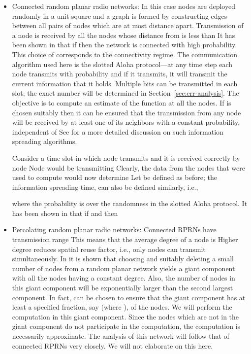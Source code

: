 \documentclass[10pt,twosided,a4paper,draft,onecolumn]{article}
\begin{document}
\begin{itemize}
\item Connected random planar radio networks: In this case nodes are
  deployed randomly in a unit square and a graph is formed by
  constructing edges between all pairs of nodes which are at most
   distance apart. Transmission of a node  is received by all
  the nodes  whose distance from  is less than  It has
  been shown in \cite{Gupta00,Penrose03} that if  then the network is connected with
  high probability. This choice of  corresponds to the
  connectivity regime. The communication algorithm used here is the
  slotted Aloha protocol---at any time step  each node transmits
  with probability  and if it transmits, it will transmit the
  current information that it holds. Multiple bits can be transmitted
  in each slot; the exact number will be determined in Section~\ref{sec:err-analysis}.
  The objective is to compute an estimate of the function at all the
  nodes. If  is chosen suitably then it can be ensured that the
  transmission from any node will be received by at least one of its
  neighbors with a constant probability, independent of  See
  \cite{Kamath08} for a more detailed discussion on such information
  spreading algorithms.

  Consider a time slot  in which node  transmits and it is
  received correctly by node  Node  would be transmitting
   Clearly, the data from the nodes that were used to compute
   would now determine  Let  be defined as
  before; the information spreading time,  can also be defined
  similarly, i.e., 

where the probability is over the randomness in the slotted Aloha
  protocol. It has been shown in \cite{Kamath08} that if  and 
  then


\item Percolating random planar radio networks: Connected RPRNs have
  transmission range 
  This means that the average degree of a node is 
  Higher degree reduces spatial reuse factor, i.e., only
   nodes can transmit
  simultaneously. In \cite{Iyer11} it is shown that choosing  and suitably deleting a small number of nodes
  from a random planar network yields a giant component with all the
  nodes having a constant degree. Also, the number of nodes in this
  giant component will be exponentially larger than the second largest
  component. In fact,  can be chosen to ensure that the giant
  component has at least a specified fraction, say  (where
  ), of the nodes. We will perform the computation in
  this giant component. Since the nodes which are not in the giant
  component do not participate in the computation, the computation is
  necessarily approximate. The analysis of this network will follow
  that of connected RPRNs very closely. We will not elaborate on this
  here.
\end{itemize} 
\end{document}
